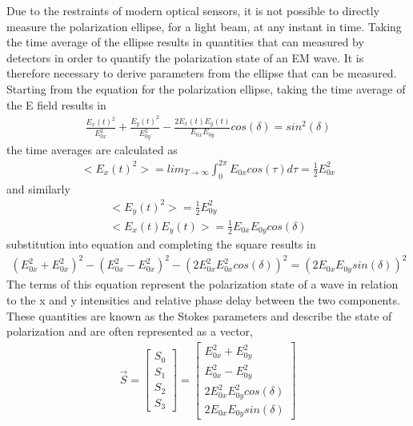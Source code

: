 Due to the restraints of modern optical sensors, it is not possible to directly measure the polarization ellipse, for a light beam, at any instant in time.  Taking the time average of the ellipse results in quantities that can measured by detectors in order to quantify the polarization state of an EM wave.  It is therefore necessary to derive parameters from the ellipse that can be measured.
Starting from the equation for the polarization ellipse, taking the time average of the E field results in
%
\begin{align}
    \frac{E_x (t)^2}{E_{0x}^2} + \frac{E_y (t)^2}{E_{0y}^2} - \frac{2 E_x (t) E_y (t)}{E_{0x} E_{0y} } cos(\delta)=sin^2 (\delta)
\end{align}
%
the time averages are calculated as
%
\begin{align}
    <E_x (t)^2> = lim_{T \rightarrow \infty} \int_{0}^{2\pi} E_{0x} cos(\tau)  d\tau=\frac{1}{2} E_{0x}^2
\end{align}
%
and similarly
%
\begin{align}
    <E_y (t)^2>  = \frac{1}{2} E_{0y}^2 \\
	<E_x (t) E_y (t)>  =  \frac{1}{2} E_{0x} E_{0y} cos(\delta)
\end{align}
%
substitution into equation and completing the square results in
%
\begin{align}
    (E_{0x}^2+E_{0x}^2 )^2-(E_{0x}^2-E_{0x}^2 )^2-(2E_{0x}^2 E_{0x}^2  cos(\delta) )^2=(2E_{0x} E_{0y}  sin(\delta))^2
\end{align}
%
The terms of this equation represent the polarization state of a wave in relation to the x and y intensities and relative phase delay between the two components.
These quantities are known as the Stokes parameters and describe the state of polarization and are often represented as a vector,
%
\begin{align}
    \vec{S} =
    \begin{bmatrix}
        S_0 \\
        S_1 \\
        S_2 \\
        S_3
    \end{bmatrix}
    =
    \begin{bmatrix}
        E_{0x}^2+E_{0y}^2 \\
        E_{0x}^2-E_{0y}^2 \\
        2E_{0x}^2 E_{0y}^2 cos(\delta) \\
        2E_{0x} E_{0y}  sin(\delta)
    \end{bmatrix}
\end{align}
